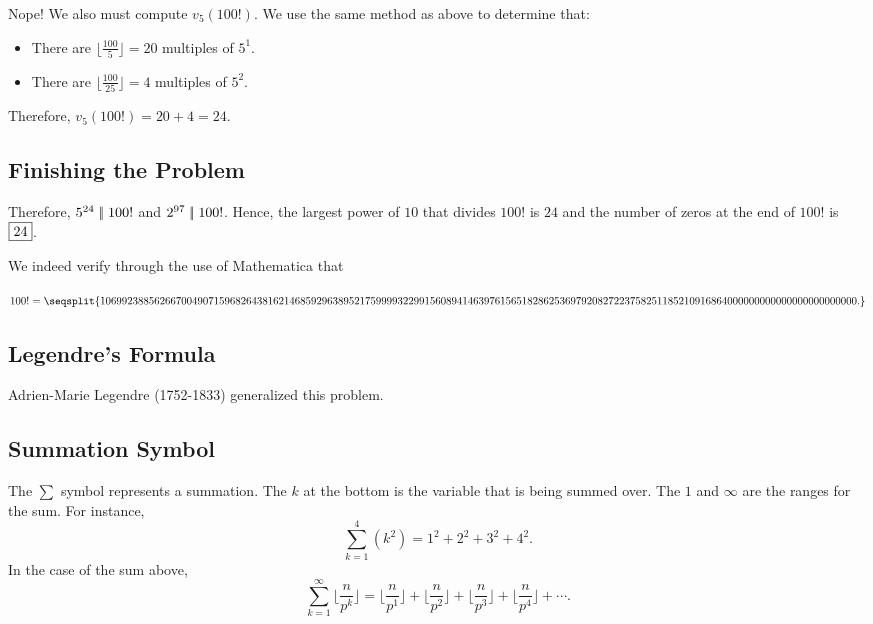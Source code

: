 Nope! We also must compute $v_5(100!)$. We use the same method as above to determine that:
\begin{itemize}
	\item There are $\lfloor \frac{100}{5} \rfloor=20$ multiples of $5^1$.
	\item There are $\lfloor \frac{100}{25} \rfloor=4$ multiples of $5^2$.
\end{itemize} 

Therefore, $v_5(100!)=20+4=24$.  

\clearpage

\subsection*{Finishing the Problem}

Therefore, $5^{24}\mid\!\mid 100!$ and $2^{97}\mid\!\mid 100!$.  Hence, the largest power of $10$ that divides $100!$ is $24$ and the number of zeros at the end of $100!$ is $\framebox{24}$.   

We indeed verify through the use of Mathematica that

$100!=\seqsplit{%
				10699238856266700490715 96826438162146859296389
				52175999932299156089414
				6397615651828625369792082
				7223758251185210916864
				000000000000000000000000.}$

\clearpage

\subsection{Legendre's Formula}

Adrien-Marie Legendre (1752-1833) generalized this problem.  


\clearpage

\subsection*{Summation Symbol}

The $\sum$ symbol represents a summation. The $k$ at the bottom is the variable that is being summed over. The $1$ and $\infty$ are the ranges for the sum. For instance, $$\sum_{k=1}^{4}(k^2)=1^2+2^2+3^2+4^2.$$  
In the case of the sum above, $$\sum_{k=1}^{\infty}\lfloor \frac{n}{p^k} \rfloor=\lfloor \frac{n}{p^1}\rfloor+\lfloor \frac{n}{p^2}\rfloor+\lfloor \frac{n}{p^3} \rfloor+\lfloor \frac{n}{p^4} \rfloor+\cdots.$$  

